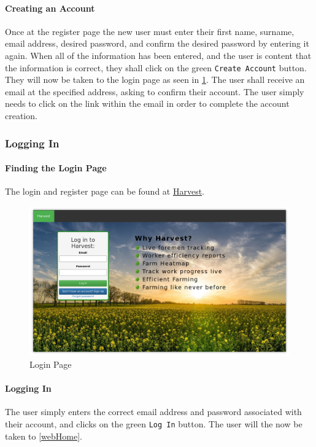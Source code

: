 \documentclass[11pt]{article}
\begin{document}
\paragraph{Creating an Account}Once at the register page the new user must enter their first name, surname, email address, desired password, and confirm the desired password by entering it again. When all of the information has been entered, and the user is content that the information is correct, they shall click on the green \texttt{Create Account} button. They will now be taken to the login page as seen in \ref{LoginPage}. The user shall receive an email at the specified address, asking to confirm their account. The user simply needs to click on the link within the email in order to complete the account creation.

\subsubsection{Logging In}
\paragraph{Finding the Login Page}The login and register page can be found at \href{https://harvestapp.co.za}{Harvest}.

\begin{figure}
 \centering
 \includegraphics[width=12cm, keepaspectratio]{Images/webLogin.png}
 \caption{Login Page}
 \label{LoginPage}
\end{figure}

\paragraph{Logging In}The user simply enters the correct email address and password associated with their account, and clicks on the green \texttt{Log In} button. The user will the now be taken to \ref{webHome}.
\end{document}
